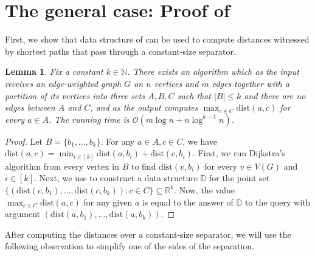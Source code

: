 \documentclass[11pt,a4paper]{article}
\newtheorem{lemma}{Lemma}[section]
\newcommand{\Oh}{\mathcal{O}}
\newcommand{\dist}{\mathrm{dist}}
\renewcommand{\leq}{\leqslant}
\begin{document}
\section{The general case: Proof of \texorpdfstring{}{Theorem 1.6}}\label{sec:algo}

First, we show that data structure of  can be used to compute distances witnessed by shortest paths that pass through a constant-size separator.

\begin{lemma}\label{l:single_adhesion}
Fix a constant $k \in \mathbb{N}$. There exists an algorithm which as the input receives an edge-weighted graph $G$ on $n$ vertices and $m$ edges together with a partition of its vertices into three sets $A, B, C$ such that $|B| \leq k$ and there are no edges between $A$ and $C$, and as the output computes $\max_{c \in C} \dist(a, c)$ for every $a \in A$. The running time is $\Oh(m \log n + n \log^{k - 1} n)$.
\end{lemma}

\begin{proof}
Let $B = \{b_1, \ldots, b_k\}$. For any $a \in A, c \in C$, we have $\dist(a, c) = \min_{i \in [k]} \dist(a, b_i) + \dist(c, b_i)$. First, we run Dijkstra's algorithm from every vertex in $B$ to find $\dist(v, b_i)$ for every $v \in V(G)$ and $i \in [k]$. Next, we use  to construct a data structure $\mathbb{D}$ for the point set $\{(\dist(c, b_1), \dots, \dist(c, b_k))\colon c\in C\}\subseteq \mathbb{R}^k$. Now, the value $\max_{c \in C} \dist(a, c)$ for any given $a$ is equal to the answer of $\mathbb{D}$ to the query with argument $(\dist(a, b_1), \dots, \dist(a, b_k))$.
\end{proof}

After computing the distances over a constant-size separator, we will use the following observation to simplify one of the sides of the separation.
\end{document}
